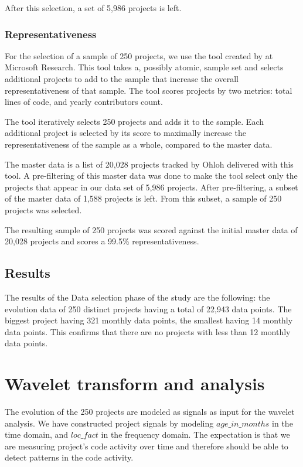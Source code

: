 After this selection, a set of 5,986 projects is left.

\subsubsection{Representativeness}
For the selection of a sample of 250 projects, we use the tool created by
\citet{nagappan} at Microsoft Research. This tool takes a, possibly atomic,
sample set and selects additional projects to add to the sample that increase
the overall representativeness of that sample. The tool scores projects by two
metrics: total lines of code, and yearly contributors count.

The tool iteratively selects 250 projects and adds it to the sample. Each
additional project is selected by its score to maximally increase the
representativeness of the sample as a whole, compared to the master data.

The master data is a list of 20,028 projects tracked by Ohloh delivered with
this tool. A pre-filtering of this master data was done to make the tool select
only the projects that appear in our data set of 5,986 projects. After
pre-filtering, a subset of the master data of 1,588 projects is left. From this
subset, a sample of 250 projects was selected.

The resulting sample of 250 projects was scored against the initial master data
of 20,028 projects and scores a 99.5\% representativeness.

\subsection{Results}
The results of the Data selection phase of the study are the following: the
evolution data of 250 distinct projects having a total of 22,943 data points.
The biggest project having 321 monthly data points, the smallest having 14
monthly data points. This confirms that there are no projects with less
than 12 monthly data points.


\section{Wavelet transform and analysis}
\label{method:dwt}

The evolution of the 250 projects are modeled as signals as input for the
wavelet analysis. We have constructed project signals by modeling
$age\_in\_months$ in the time domain, and $loc\_fact$ in the frequency domain.
The expectation is that we are measuring project's code activity over time and
therefore should be able to detect patterns in the code activity.

